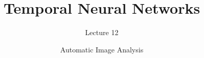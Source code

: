 \documentclass[aspectratio=169,xcolor=dvipsnames]{beamer}
\title[short title]{Temporal Neural Networks}
\subtitle{Lecture 12}
\author{Automatic Image Analysis}
\begin{document}
\begin{frame}
    \titlepage
\end{frame}


\end{document}
